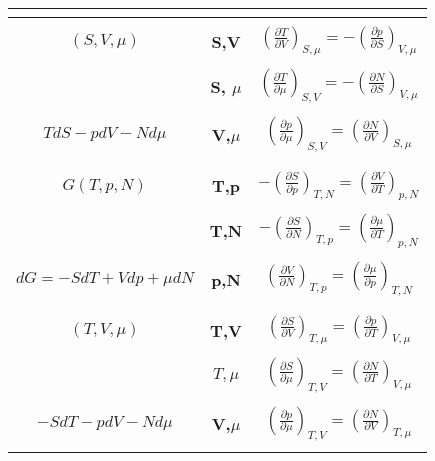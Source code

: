 \documentclass{article}
\begin{document}
\begin{tabular}{|>{\Large\bfseries}c|>{\Large\bfseries}c|>{\Large\bfseries}c|}
    & & \\
    \hline
    & & \\
    \normalfont $(S,V, \mu)$ & \normalfont S,V & \normalfont $(\frac{\partial T}{\partial V})_{S, \mu} = -(\frac{\partial p}{\partial S})_{V, \mu} $ \\
    & & \\
    & \normalfont S, $\mu$  & \normalfont $(\frac{\partial T }{\partial \mu})_{S,V}= -(\frac{\partial N}{\partial S})_{V,\mu}$ \\
    & & \\
    \normalfont $TdS-pdV-Nd \mu$ & \normalfont V,$\mu$ & \normalfont $(\frac{\partial p}{\partial \mu})_{S,V} = (\frac{\partial N}{\partial V	})_{S, \mu}$ \\    
    & & \\    
    \hline
    & & \\
    \normalfont $G(T,p,N)$ & \normalfont T,p & \normalfont $-(\frac{\partial S}{\partial p})_{T,N}= (\frac{\partial V}{\partial T})_{p,N}$ \\
    & & \\
    & \normalfont T,N & \normalfont $-(\frac{\partial S }{\partial N})_{T,p}=(\frac{\partial \mu}{\partial T})_{p,N}$ \\
    & & \\
    \normalfont $dG=-SdT+Vdp+ \mu dN$ & \normalfont p,N & \normalfont $(\frac{\partial V}{\partial N})_{T,p}= (\frac{\partial \mu}{\partial p})_{T,N}$ \\
    & & \\
    \hline
    & & \\
    \normalfont $(T,V, \mu)$ & \normalfont T,V & \normalfont $(\frac{\partial S}{\partial V})_{T, \mu} = (\frac{\partial p}{\partial T})_{V, \mu}$ \\
    & & \\
    & \normalfont $T, \mu$ & \normalfont $(\frac{\partial S}{\partial \mu})_{T,V}= (\frac{\partial N}{\partial T})_{V,\mu}$ \\    
    & & \\
    \normalfont $-SdT-pdV-Nd \mu$ & \normalfont V,$\mu$ & \normalfont $(\frac{\partial p}{\partial \mu })_{T,V}= (\frac{\partial N}{\partial V})_{T,\mu}$ \\
    & & \\
    \hline  
\end{tabular}
 
\end{document}
